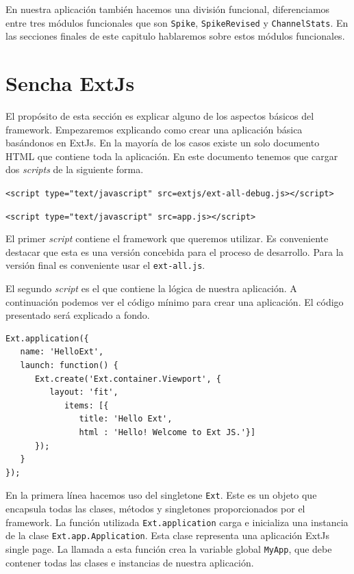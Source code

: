 \par
En nuestra aplicación también hacemos una división funcional, diferenciamos entre tres módulos funcionales que son \texttt{Spike},
\texttt{SpikeRevised} y \texttt{ChannelStats}. En las secciones finales de este capitulo hablaremos sobre estos módulos funcionales. 

\section{Sencha ExtJs}
	El propósito de esta sección es explicar alguno de los aspectos básicos del framework. Empezaremos explicando como crear una aplicación básica
	basándonos en ExtJs. En la mayoría de los casos existe un solo documento HTML\cite{HTML} que contiene toda la aplicación. En este documento
	tenemos que cargar dos \emph{scripts} de la siguiente forma.
    		\begin{center} \texttt{<script type="text/javascript" src=\textquotedbl extjs/ext-all-debug.js\textquotedbl ></script>}  \end{center}
    		\begin{center} \texttt{<script type="text/javascript" src=\textquotedbl app.js\textquotedbl ></script>}  \end{center}
	El primer \emph{script} contiene el framework que queremos utilizar. Es conveniente destacar que esta es una versión concebida para el proceso
	de desarrollo. Para la versión final es conveniente usar el \texttt{ext-all.js}.
 	\par
	El segundo \emph{script} es el que contiene la lógica de nuestra aplicación. A continuación podemos ver el código mínimo para crear una
	aplicación. El código presentado será explicado a fondo.
	\begin{lstlisting}
Ext.application({
   name: 'HelloExt',
   launch: function() {
      Ext.create('Ext.container.Viewport', {
         layout: 'fit',
            items: [{
               title: 'Hello Ext',
               html : 'Hello! Welcome to Ext JS.'}] 
      }); 
   } 
});
	\end{lstlisting}
	En la primera línea hacemos uso del singletone \texttt{Ext}. Este es un objeto que encapsula todas las clases, métodos y singletones
	proporcionados por el framework. La función utilizada \texttt{Ext.application} carga e inicializa una instancia de la clase
	\texttt{Ext.app.Application}. Esta clase representa una aplicación ExtJs single page. La llamada a esta función crea la variable global
	\texttt{MyApp}, que debe contener todas las clases e instancias de nuestra aplicación.
